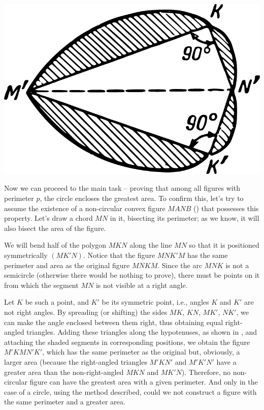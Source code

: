 \begin{marginfigure}%
\centering
\includegraphics[width=\textwidth]{figures/ch-12/fig-180.pdf}
\end{marginfigure}

Now we can proceed to the main task -- proving that among all figures with perimeter \(p\), the circle encloses the greatest area. To confirm this, let's try to assume the existence of a non-circular convex figure \(MANB\) () that possesses this property. Let's draw a chord \(MN\) in it, bisecting its perimeter; as we know, it will also bisect the area of the figure.





We will bend half of the polygon $MKN$ along the line $MN$ so that it is positioned symmetrically $(MK'N)$. Notice that the figure $MNK'M$ has the same perimeter and area as the original figure $MNKM$. Since the arc $MNK$ is not a semicircle (otherwise there would be nothing to prove), there must be points on it from which the segment $MN$ is not visible at a right angle. 

Let $K$ be such a point, and $K'$ be its symmetric point, i.e., angles $K$ and $K'$ are not right angles. By spreading (or shifting) the sides $MK$, $KN$, $MK'$, $NK'$, we can make the angle enclosed between them right, thus obtaining equal right-angled triangles. Adding these triangles along the hypotenuses, as shown in , and attaching the shaded segments in corresponding positions, we obtain the figure $M'KMN'K'$, which has the same perimeter as the original but, obviously, a larger area (because the right-angled triangles $M'KN'$ and $M'K'N'$ have a greater area than the non-right-angled $MKN$ and $MK'N$). Therefore, no non-circular figure can have the greatest area with a given perimeter. And only in the case of a circle, using the method described, could we not construct a figure with the same perimeter and a greater area.

